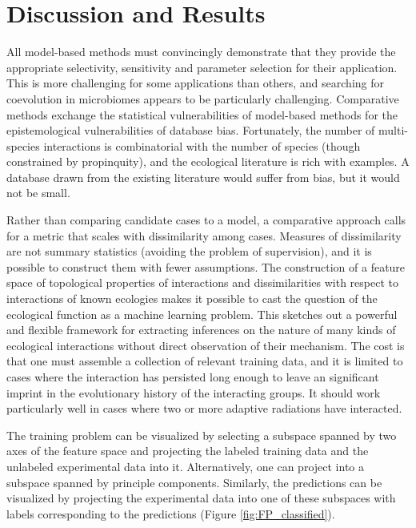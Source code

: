 \section{Discussion and Results}

All model-based methods must convincingly demonstrate that they provide the appropriate selectivity, sensitivity and parameter selection for their application. This is more challenging for some applications than others, and searching for coevolution in microbiomes appears to be particularly challenging. Comparative methods exchange the statistical vulnerabilities of model-based methods for the epistemological vulnerabilities of database bias. Fortunately, the number of multi-species interactions is combinatorial with the number of species (though constrained by propinquity), and the ecological literature is rich with examples. A database drawn from the existing literature would suffer from bias, but it would not be small.

Rather than comparing candidate cases to a model, a comparative approach calls for a metric that scales with dissimilarity among cases. Measures of dissimilarity are not summary statistics (avoiding the problem of supervision), and it is possible to construct them with fewer assumptions. The construction of a feature space of topological properties of interactions and dissimilarities with respect to interactions of known ecologies makes it possible to cast the question of the ecological function as a machine learning problem. This sketches out a powerful and flexible framework for extracting inferences on the nature of many kinds of ecological interactions without direct observation of their mechanism. The cost is that one must assemble a collection of relevant training data, and it is limited to cases where the interaction has persisted long enough to leave an significant imprint in the evolutionary history of the interacting groups. It should work particularly well in cases where two or more adaptive radiations have interacted.

The training problem can be visualized by selecting a subspace spanned by two axes of the feature space and projecting the labeled training data and the unlabeled experimental data into it. Alternatively, one can project into a subspace spanned by principle components. Similarly, the predictions can be visualized by projecting the experimental data into one of these subspaces with labels corresponding to the predictions (Figure \ref{fig:FP_classified}).



